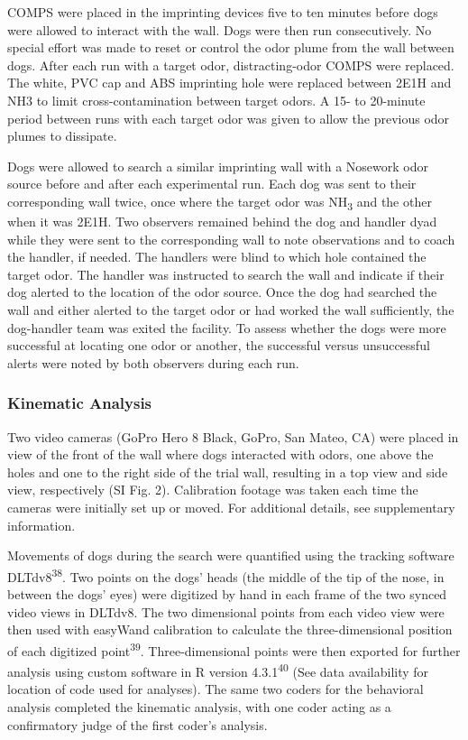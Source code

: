 \documentclass[
]{article}
\begin{document}
COMPS were placed in the imprinting devices five to ten minutes before dogs were allowed to interact with the wall. Dogs were then run consecutively. No special effort was made to reset or control the odor plume from the wall between dogs. After each run with a target odor, distracting-odor COMPS were replaced. The white, PVC cap and ABS imprinting hole were replaced between 2E1H and NH3 to limit cross-contamination between target odors. A 15- to 20-minute period between runs with each target odor was given to allow the previous odor plumes to dissipate.

Dogs were allowed to search a similar imprinting wall with a Nosework odor source before and after each experimental run. Each dog was sent to their corresponding wall twice, once where the target odor was NH\textsubscript{3} and the other when it was 2E1H. Two observers remained behind the dog and handler dyad while they were sent to the corresponding wall to note observations and to coach the handler, if needed. The handlers were blind to which hole contained the target odor. The handler was instructed to search the wall and indicate if their dog alerted to the location of the odor source. Once the dog had searched the wall and either alerted to the target odor or had worked the wall sufficiently, the dog-handler team was exited the facility. To assess whether the dogs were more successful at locating one odor or another, the successful versus unsuccessful alerts were noted by both observers during each run.

\hypertarget{kinematic-analysis}{%
\subsubsection{Kinematic Analysis}\label{kinematic-analysis}}

Two video cameras (GoPro Hero 8 Black, GoPro, San Mateo, CA) were placed in view of the front of the wall where dogs interacted with odors, one above the holes and one to the right side of the trial wall, resulting in a top view and side view, respectively (SI Fig. 2). Calibration footage was taken each time the cameras were initially set up or moved. For additional details, see supplementary information.

Movements of dogs during the search were quantified using the tracking software DLTdv8\textsuperscript{38}. Two points on the dogs' heads (the middle of the tip of the nose, in between the dogs' eyes) were digitized by hand in each frame of the two synced video views in DLTdv8. The two dimensional points from each video view were then used with easyWand calibration to calculate the three-dimensional position of each digitized point\textsuperscript{39}. Three-dimensional points were then exported for further analysis using custom software in R version 4.3.1\textsuperscript{40} (See data availability for location of code used for analyses). The same two coders for the behavioral analysis completed the kinematic analysis, with one coder acting as a confirmatory judge of the first coder's analysis.
\end{document}
